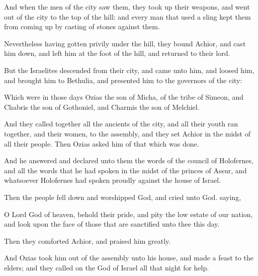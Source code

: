 {\par }{\PP {}And when the men of the city saw them, they took up their weapons, and went out of the city to the top of the hill: and every man that used a sling kept them from coming up by casting of stones against them.
\par }{\PP {}Nevertheless having gotten privily under the hill, they bound Achior, and cast him down, and left him at the foot of the hill, and returned to their lord.
\par }{\PP {}But the Israelites descended from their city, and came unto him, and loosed him, and brought him to Bethulia, and presented him to the governors of the city:
\par }{\PP {}Which were in those days Ozias the son of Micha, of the tribe of Simeon, and Chabris the son of Gothoniel, and Charmis the son of Melchiel.
\par }{\PP {}And they called together all the ancients of the city, and all their youth ran together, and their women, to the assembly, and they set Achior in the midst of all their people. Then Ozias asked him of that which was done.
\par }{\PP {}And he answered and declared unto them the words of the council of Holofernes, and all the words that he had spoken in the midst of the princes of Assur, and whatsoever Holofernes had spoken proudly against the house of Israel.
\par }{\PP {}Then the people fell down and worshipped God, and cried unto God. saying,
\par }{\PP {}O Lord God of heaven, behold their pride, and pity the low estate of our nation, and look upon the face of those that are sanctified unto thee this day.
\par }{\PP {}Then they comforted Achior, and praised him greatly.
\par }{\PP {}And Ozias took him out of the assembly unto his house, and made a feast to the elders; and they called on the God of Israel all that night for help.

}
